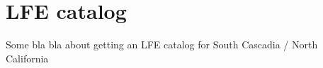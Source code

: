 \documentclass[main.tex]{subfiles}
\begin{document}
\part{LFE catalog}

Some bla bla about getting an LFE catalog for South Cascadia / North California
\end{document}
